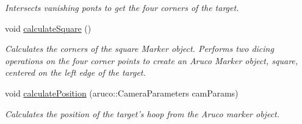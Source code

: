 \begin{DoxyCompactItemize}
\begin{DoxyCompactList}\small\item\em Intersects vanishing ponts to get the four corners of the target. \item\end{DoxyCompactList}\item 
void \hyperlink{classTarget_aad1871823a8599d3d095c988451ad3ea}{calculateSquare} ()
\begin{DoxyCompactList}\small\item\em Calculates the corners of the square Marker object. Performs two dicing operations on the four corner points to create an Aruco Marker object, square, centered on the left edge of the target. \item\end{DoxyCompactList}\item 
void \hyperlink{classTarget_aaeb297087804d9d7952b0588d76ac213}{calculatePosition} (aruco::CameraParameters camParams)
\begin{DoxyCompactList}\small\item\em Calculates the position of the target's hoop from the Aruco marker object. \item\end{DoxyCompactList}\end{DoxyCompactItemize}
